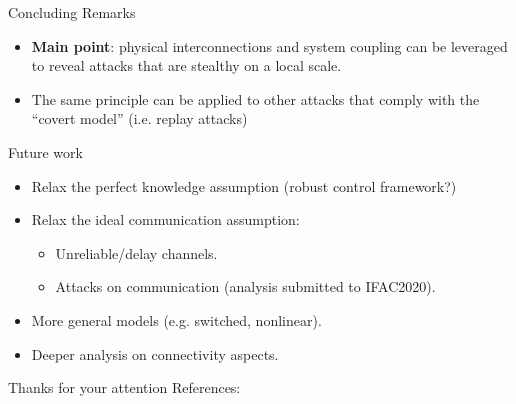 \documentclass[presentation]{beamer}
\renewcommand*{\bibfont}{\footnotesize}
\begin{document}
\begin{frame}{Concluding Remarks}
    \begin{itemize}
        \itemsep 2ex
        \item<1-> \textbf{Main point}: physical interconnections and system coupling can be leveraged to reveal attacks that are stealthy on a local scale. %
        \item<2-> The same principle can be applied to other attacks that comply with the ``covert model'' (i.e. replay attacks)
    \end{itemize}
\end{frame}

\begin{frame}{Future work}
    \begin{itemize}
    \itemsep 1.5ex
        \item Relax the perfect knowledge assumption (robust control framework?)
        \item Relax the ideal communication assumption:
            \begin{itemize}
                \item Unreliable/delay channels.
                \item Attacks on communication (analysis submitted to IFAC2020).
            \end{itemize}
        \item More general models (e.g. switched, nonlinear).
        \item Deeper analysis on connectivity aspects.
    \end{itemize}
\end{frame}

\begin{frame}{Thanks for your attention}
\hbox{\large References:}
\bigskip
\renewcommand*{\bibfont}{\scriptsize}
\printbibliography
\end{frame}
\end{document}
